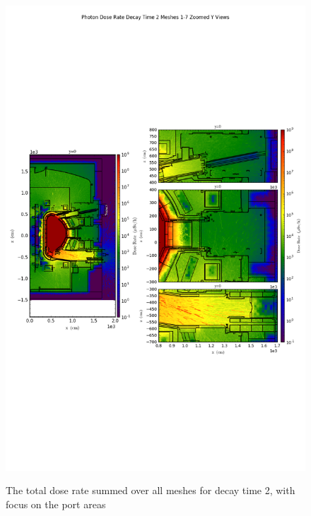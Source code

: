 \documentclass[12pt]{article}
\begin{document}
\begin{figure}[ht!]
\centering
\includegraphics[trim={0cm 9cm 0cm 10cm},clip,scale=0.75]{../plots/final_model/Photon_Dose_Rate_Decay_Time_2_Meshes_1-7_Zoomed_Y_Views.png}
\label{fig:photons_dc2_b4c_total_zoomed}
\caption{The total dose rate summed over all meshes for decay time 2, with focus on the port areas}
\end{figure}
\end{document}
